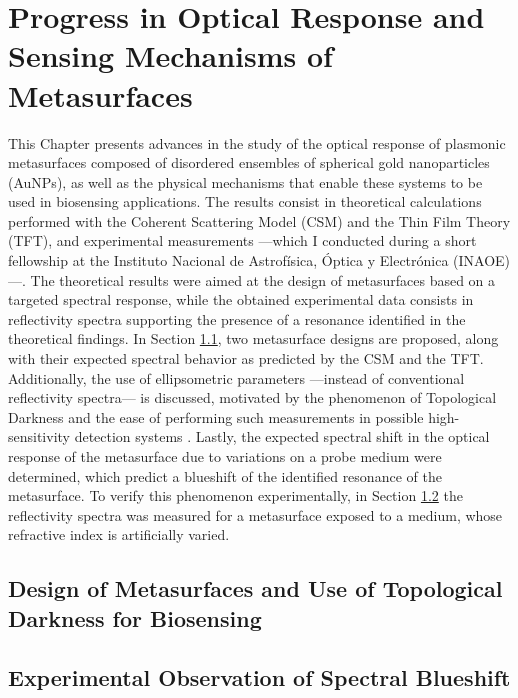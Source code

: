 \documentclass[11pt]{Latex/Classes/PhDthesisPSnPDF}
\begin{document}
\chapter{Progress in Optical Response and Sensing Mechanisms of Metasurfaces}
	\label{s:OptRes}
%	
	This Chapter presents advances in the study of the optical response of plasmonic metasurfaces composed of disordered ensembles of spherical gold nanoparticles (AuNPs), as well as the physical mechanisms that enable these systems to be used in biosensing applications. The results consist in theoretical calculations performed with the Coherent Scattering Model (CSM) and the  Thin Film Theory (TFT), and experimental measurements ---which I conducted during a short fellowship at the Instituto Nacional de Astrofísica, Óptica y Electrónica (INAOE)---. The theoretical results were aimed at the design of metasurfaces based on a targeted spectral response, while the obtained experimental data consists in reflectivity spectra supporting the presence of a resonance identified in the theoretical findings. In Section \ref{s:TDarkness}, two metasurface designs are proposed, along with their expected spectral behavior as predicted by the CSM and the TFT. Additionally, the use of ellipsometric parameters ---instead of conventional reflectivity spectra--- is discussed, motivated by the phenomenon of Topological Darkness \cite{ermolaev_topological_2022} and the ease of performing such measurements in possible high-sensitivity  detection systems \cite{kabashin_label-free_2023}.  Lastly, the expected spectral shift in the optical response of the metasurface due to variations on a probe medium were determined, which predict a blueshift of the identified resonance of the metasurface. To verify this phenomenon experimentally, in Section \ref{s:ExpBS} the reflectivity spectra was measured for a metasurface exposed to a medium, whose refractive index is artificially varied.
		
	\section{Design of Metasurfaces and Use of Topological Darkness for Biosensing}
		\label{s:TDarkness}
				
		
	\section{Experimental Observation of Spectral Blueshift}
		\label{s:ExpBS}
		
		
\end{document}
